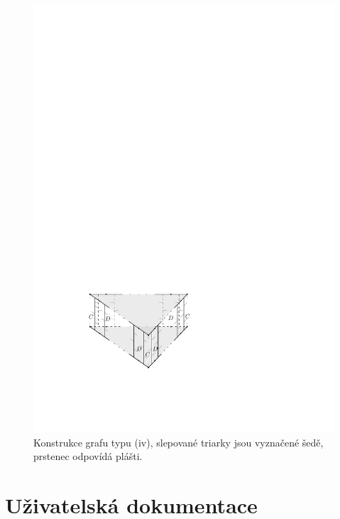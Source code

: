 \begin{figure}[h!]\centering
\includegraphics[width = \textwidth]{../img/iv-construction}
\caption{Konstrukce grafu typu (iv), slepované triarky jsou vyznačené šedě, prstenec odpovídá plášti.}
\label{obr03:konstrukceiv}
\end{figure}



\section{Uživatelská dokumentace}


